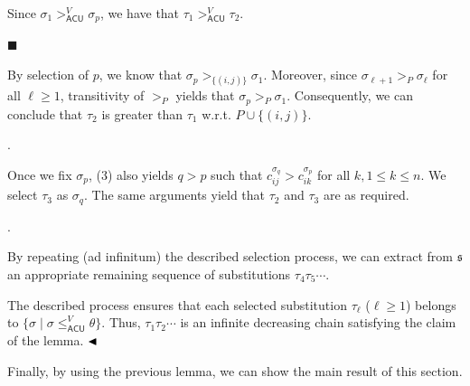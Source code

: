 \documentclass[10pt,a4paper]{amsart}
\begin{document}
Since $\sigma_{1}>_{\mathsf{ACU}}^{V}\sigma_{p}$, we have that $\tau_{1}>_{\mathsf{ACU}}^{V}\tau_{2}$.\par
 
 
 
\par\noindent  $\blacksquare$ 
 
By selection of $p$, we know that $\sigma_{p}>_{\{(i,j)\}}\sigma_{1}$. Moreover, since $\sigma_{\ell+1}>_{P}\sigma_{\ell}$ for all $\ell\geq 1$, transitivity of $>_{P}$ yields that $\sigma_{p}>_{P}\sigma_{1}$. Consequently, we can conclude that $\tau_{2}$ is greater than $\tau_{1}$ w.r.t. $P\cup\{(i,j)\}$.\par
 
 
  
 
 
\par{}. 
 
Once we fix $\sigma_{p}$, (3) also yields $q>p$ such that $c^{\sigma_{q}}_{ij}>c^{\sigma_{p}}_{ik}$ for all $k,1\leq k\leq n$. We select $\tau_{3}$ as $\sigma_{q}$. The same arguments yield that $\tau_{2}$ and $\tau_{3}$ are as required.\par
 
 
 
\par{}. 
 
By repeating (ad infinitum) the described selection process, we can extract from $\mathfrak{s}$ an appropriate remaining sequence of substitutions $\tau_{4}\tau_{5}\cdots$.\par
 
 
  
The described process ensures that each selected substitution $\tau_{\ell}$ ($\ell\geq 1$) belongs to $\{\sigma\mid\sigma\leq_{\mathsf{ACU}}^{V}\theta\}$. Thus, $\tau_{1}\tau_{2}\cdots$ is an infinite decreasing chain satisfying the claim of the lemma. $\hfill\blacktriangleleft$\par
 
 
 
Finally, by using the previous lemma, we can show the main result of this section.\par
 
 
\end{document}
